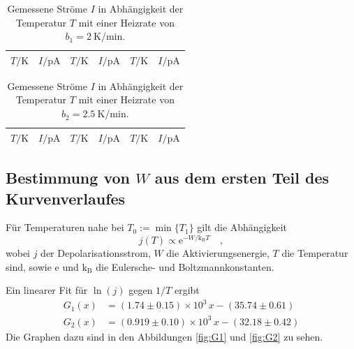 \begin{table}[htpb]
	\centering
	\begin{tabular}{cc|cc|cc}
		\midrule
		\midrule
		$T / \si{\kelvin}$ &
		$I / \si{\pA}$ &
		$T / \si{\kelvin}$ &
		$I / \si{\pA}$ &
		$T / \si{\kelvin}$ &
		$I / \si{\pA}$ \\
		\midrule
		
		\midrule
		\midrule
	\end{tabular}
	\caption{Gemessene Ströme $I$ in Abhängigkeit der Temperatur $T$ mit
		einer Heizrate von $b_1 = \SI{2}{\kelvin\per\minute}$.}
	\label{tab:tab1}
\end{table}
%
\begin{table}[htpb]
	\centering
	\begin{tabular}{cc|cc|cc}
		\midrule
		\midrule
		$T / \si{\kelvin}$ &
		$I / \si{\pA}$ &
		$T / \si{\kelvin}$ &
		$I / \si{\pA}$ &
		$T / \si{\kelvin}$ &
		$I / \si{\pA}$ \\
		\midrule
		
		\midrule
		\midrule
	\end{tabular}
	\caption{Gemessene Ströme $I$ in Abhängigkeit der Temperatur $T$ mit
		einer Heizrate von $b_2 = \SI{2.5}{\kelvin\per\minute}$.}
	\label{tab:tab2}
\end{table}
%
\subsection{Bestimmung von $W$ aus dem ersten Teil des Kurvenverlaufes}
Für Temperaturen nahe bei $T_0:=\min\{T_1\}$ gilt die Abhängigkeit
\begin{equation}
j(T)\propto \text{e}^{-W/\text{k}_\text{B}T} \quad ,
\end{equation}
wobei $j$ der Depolarisationsstrom, $W$ die Aktivierungsenergie, $T$ die
Temperatur sind, sowie $\text{e}$ und $\text{k}_\text{B}$ die Eulersche- und
Boltzmannkonstanten.

Ein linearer Fit für $\ln(j)$ gegen $1/T$ ergibt
%
%
\begin{align}
G_1(x)&= ( 1.74\pm 0.15)\times 10^{3} \,x - (35.74 \pm 0.61) \\
G_2(x)&= (0.919 \pm 0.10 )\times 10^{3} \,x - (32.18 \pm 0.42)
\end{align}
Die Graphen dazu sind in den Abbildungen \ref{fig:G1} und \ref{fig:G2} zu sehen.

